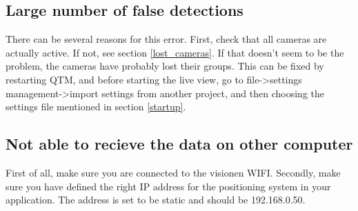 \documentclass{article}
\begin{document}
\subsection{Large number of false detections}
There can be several reasons for this error. First, check that all cameras are actually active. If not, see section \ref{lost_cameras}. If that doesn't seem to be the problem, the cameras have probably lost their groups. This can be fixed by restarting QTM, and before starting the live view, go to file->settings management->import settings from another project, and then choosing the settings file mentioned in section \ref{startup}.

\subsection{Not able to recieve the data on other computer}
First of all, make sure you are connected to the visionen WIFI. Secondly, make sure you have defined the right IP address for the positioning system in your application. The address is set to be static and should be 192.168.0.50.
\end{document}
